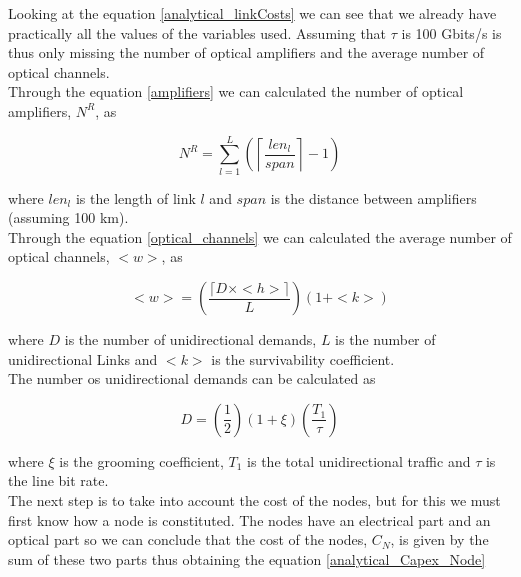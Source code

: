 \vspace{11pt}
Looking at the equation \ref{analytical_linkCosts} we can see that we already have practically all the values of the variables used. Assuming that $\tau$ is 100 Gbits/s is thus only missing the number of optical amplifiers and the average number of optical channels.\\

Through the equation \ref{amplifiers} we can calculated the number of optical amplifiers, $N^R$, as

\begin{equation}
N^R = \sum\limits_{l=1}^L\left(\left\lceil\frac{len_l}{span}\right\rceil-1\right)
\label{amplifiers}
\end{equation}

\vspace{11pt}
\noindent
where $len_l$ is the length of link $l$ and $span$ is the distance between amplifiers (assuming 100 km).\\
Through the equation \ref{optical_channels} we can calculated the average number of optical channels, $<w>$, as

\begin{equation}
<w> = \left( \frac{\lceil D \times <h> \rceil}{L} \right) \left( 1 + <k>\right)
\label{optical_channels}
\end{equation}

\vspace{11pt}
\noindent
where $D$ is the number of unidirectional demands, $L$ is the number of unidirectional Links and $<k>$ is the survivability coefficient.\\
The number os unidirectional demands can be calculated as

\begin{equation}
D = \left(\frac{1}{2}\right) \left( 1 + \xi \right) \left(\frac{T_1}{\tau}\right)
\label{demands}
\end{equation}

\vspace{11pt}
\noindent
where $\xi$ is the grooming coefficient, $T_1$ is the total unidirectional traffic and $\tau$ is the line bit rate.\\

The next step is to take into account the cost of the nodes, but for this we must first know how a node is constituted. The nodes have an electrical part and an optical part so we can conclude that the cost of the nodes, $C_N$, is given by the sum of these two parts thus obtaining the equation \ref{analytical_Capex_Node}

